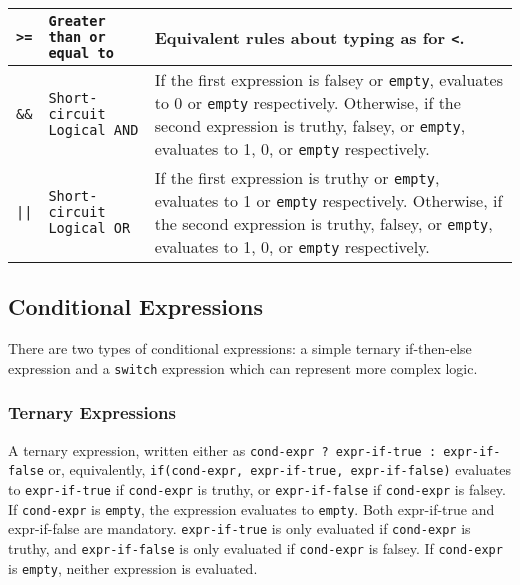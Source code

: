 \begin{table}[H]
\begin{tabular}{ |p{2cm}|p{5cm}|p{7cm}|  }
			\rule{0pt}{3ex}\texttt{>=} & \texttt{Greater than or equal to} & {Equivalent rules about typing as for \texttt{<}.} \\ \hline
			\rule{0pt}{3ex}\texttt{\&\&} & \texttt{Short-circuit Logical AND} & {If the first expression is falsey or \texttt{empty}, evaluates to 0 or \texttt{empty} respectively. Otherwise, if the second expression is truthy, falsey, or \texttt{empty}, evaluates to 1, 0, or \texttt{empty} respectively.} \\ \hline
			\rule{0pt}{3ex}\texttt{||} & \texttt{Short-circuit Logical OR} & {If the first expression is truthy or \texttt{empty}, evaluates to 1 or \texttt{empty} respectively. Otherwise, if the second expression is truthy, falsey, or \texttt{empty}, evaluates to 1, 0, or \texttt{empty} respectively.} \\ \hline
			\end{tabular}
			\end{table}
			

\subsection{Conditional Expressions}
			There are two types of conditional expressions: a simple ternary if-then-else expression and a \texttt{switch} expression which can represent more complex logic.

\subsubsection{Ternary Expressions}
\label{sec:Ternary}
A ternary expression, written either as \texttt{cond-expr ? expr-if-true : expr-if-false} or, equivalently, \texttt{if(cond-expr, expr-if-true, expr-if-false)} evaluates to \texttt{expr-if-true} if \texttt{cond-expr} is truthy, or \texttt{expr-if-false} if \texttt{cond-expr} is falsey. If \texttt{cond-expr} is \texttt{empty}, the expression evaluates to \texttt{empty}. Both expr-if-true and expr-if-false are mandatory. \texttt{expr-if-true} is only evaluated if \texttt{cond-expr} is truthy, and \texttt{expr-if-false} is only evaluated if \texttt{cond-expr} is falsey. If \texttt{cond-expr} is \texttt{empty}, neither expression is evaluated.

